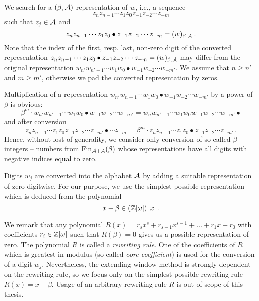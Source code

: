 We search for a $(\beta,\mathcal{A})$-representation of $w$, i.e., a  sequence 
  $$z_{n} z_{n-1}\cdots z_1 z_0 z_{-1} z_{-2} \cdots z_{-m}$$ such that $z_j \in \mathcal{A}$ and
  $$
    z_{n} z_{n-1}\cdots z_1 z_0 \bullet z_{-1} z_{-2} \cdots z_{-m}=(w)_{\beta,\mathcal{A}}\,.
  $$
  Note that the index of the first, resp. last, non-zero digit of the converted representation $z_{n} z_{n-1}\cdots z_1 z_0 \bullet z_{-1} z_{-2} \cdots z_{-m}=(w)_{\beta,\mathcal{A}}$ may differ from the original representation $w_{n'} w_{{n'}-1}\cdots w_1 w_0 \bullet w_{-1} w_{-2} \cdots w_{-m'}$. We assume that $ n\geq n'$ and $m\geq m'$, otherwise we pad the converted representation by zeros.
  
   Multiplication of a representation $w_{n'} w_{n-1}\cdots w_1 w_0 \bullet w_{-1} w_{-2} \cdots w_{-m'}$ by a power of $\beta$ is obvious:
  $$
  \beta^m \cdot w_{n'} w_{n'-1}\cdots w_1 w_0 \bullet w_{-1} w_{-2} \cdots w_{-m'} = w_{n} w_{n'-1}\cdots w_1 w_0 w_{-1} w_{-2} \cdots w_{-m'} \bullet
  $$  
  and after conversion
  $$
  z_{n} z_{n-1}\cdots z_1 z_0 z_{-1} z_{-2} \cdots z_{-m'}\bullet\cdots z_{-m} = \beta^m \cdot z_{n} z_{n-1}\cdots z_1 z_0 \bullet z_{-1} z_{-2} \cdots z_{-m'}\,. 
  $$  
Hence, without lost of generality, we consider only conversion of so-called $\beta$-integers -- numbers from $\text{Fin}_{\mathcal{A}+\mathcal{A}}(\beta)$ whose representations have all digits with negative indices equal to zero.
  
  Digits $w_j$ are converted into the alphabet $\mathcal{A}$ by adding a suitable representation of zero digitwise.
  For our purpose, we use the simplest possible representation which is deduced from the polynomial
  $$
    x-\beta \in \left(\mathbb{Z}[\omega]\right)[x]\,.
  $$

We remark that any polynomial $R(x)=r_s x^s+r_{s-1}x^{s-1}+ \dots + r_1 x+r_0$ with coefficients $r_i \in \mathbb{Z}[\omega]$ such that $R(\beta)=0$ gives us a possible representation of zero. The polynomial $R$ is called a \emph{rewriting rule}. One of the coefficients of $R$ which is greatest in modulus (so-called \emph{core coefficient}) is used for the conversion of a digit $w_j$. Nevertheless, the extending window method is strongly dependent on the rewriting rule, so we focus only on the simplest possible rewriting rule $R(x)=x-\beta$. Usage of an arbitrary rewriting rule $R$ is out of scope of this thesis.


